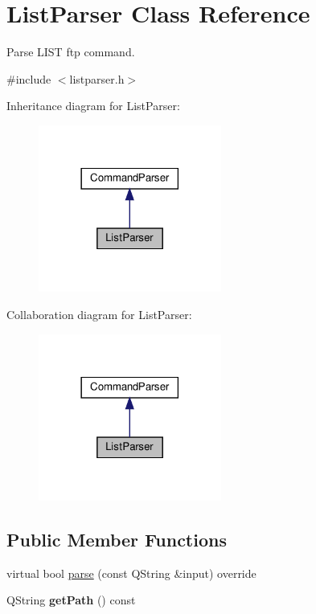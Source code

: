 \hypertarget{classListParser}{}\section{List\+Parser Class Reference}
\label{classListParser}


Parse L\+I\+ST ftp command.  




{\ttfamily \#include $<$listparser.\+h$>$}



Inheritance diagram for List\+Parser\+:\nopagebreak
\begin{figure}[H]
\begin{center}
\leavevmode
\includegraphics[width=170pt]{d7/dc0/classListParser__inherit__graph}
\end{center}
\end{figure}


Collaboration diagram for List\+Parser\+:\nopagebreak
\begin{figure}[H]
\begin{center}
\leavevmode
\includegraphics[width=170pt]{dc/d57/classListParser__coll__graph}
\end{center}
\end{figure}
\subsection*{Public Member Functions}
\begin{DoxyCompactItemize}
\item 
virtual bool \hyperlink{classListParser_ad26061c7101e88d72fc86ccec6cc13a6}{parse} (const Q\+String \&input) override
\item 
\mbox{\label{classListParser_aeda66e0a494c9d78064df1830687a273}} 
Q\+String {\bfseries get\+Path} () const
\end{DoxyCompactItemize}


